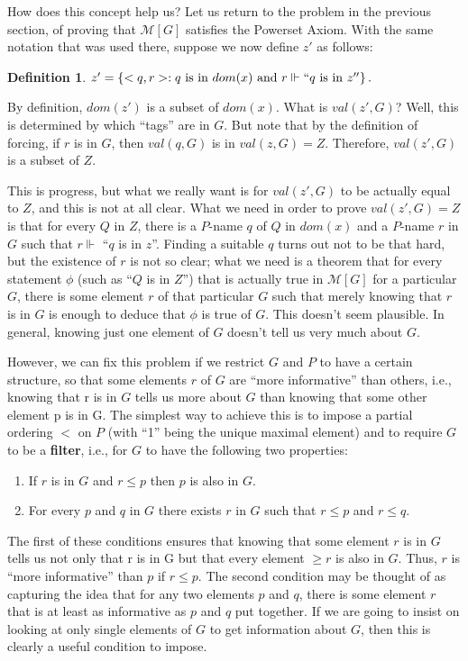 \documentclass[10pt]{article}
\theoremstyle{definition}
\newtheorem*{defn}{Definition}
\begin{document}
How does this concept help us? Let us return to the problem in the previous section, of proving that $\mathcal{M}[G]$ satisfies the Powerset Axiom. With the same notation that was used there, suppose we now define $z'$ as follows:

\begin{defn}
$z' = \left\{<q,r> : q\text{ is in }dom(x)\text{ and }r \Vdash ``q\text{ is in }z''\right\}.$
\end{defn}

By definition, $dom(z')$ is a subset of $dom(x)$. What is $val(z',G)$? Well, this is determined by which ``tags'' are in $G$. But note that by the definition of forcing, if $r$ is in $G$, then $val(q,G)$ is in $val(z,G) = Z$. Therefore, $val(z',G)$ is a subset of $Z$.

This is progress, but what we really want is for $val(z',G)$ to be actually equal to $Z$, and this is not at all clear. What we need in order to prove $val(z',G) = Z$ is that for every $Q$ in $Z$, there is a $P$-name $q$ of $Q$ in $dom(x)$ and a $P$-name $r$ in $G$ such that $r \Vdash$ ``$q$ is in $z$''. Finding a suitable $q$ turns out not to be that hard, but the existence of $r$ is not so clear; what we need is a theorem that for every statement $\phi$ (such as ``$Q$ is in $Z$'') that is actually true in $\mathcal{M}[G]$ for a particular $G$, there is some element $r$ of that particular $G$ such that merely knowing that $r$ is in $G$ is enough to deduce that $\phi$ is true of $G$. This doesn't seem plausible. In general, knowing just one element of $G$ doesn't tell us very much about $G$.

However, we can fix this problem if we restrict $G$ and $P$ to have a certain structure, so that some elements $r$ of $G$ are ``more informative'' than others, i.e., knowing that r is in $G$ tells us more about $G$ than knowing that some other element p is in G. The simplest way to achieve this is to impose a partial ordering $<$ on $P$ (with ``1'' being the unique maximal element) and to require $G$ to be a \textbf{filter}, i.e., for $G$ to have the following two properties:

\begin{enumerate}
\item If $r$ is in $G$ and $r \leq p$ then $p$ is also in $G$.
\item For every $p$ and $q$ in $G$ there exists $r$ in $G$ such that $r \leq p$ and $r \leq q$.
\end{enumerate}

The first of these conditions ensures that knowing that some element $r$ is in $G$ tells us not only that r is in G but that every element $\geq r$ is also in $G$. Thus, $r$ is ``more informative'' than $p$ if $r \leq p$. The second condition may be thought of as capturing the idea that for any two elements $p$ and $q$, there is some element $r$ that is at least as informative as $p$ and $q$ put together. If we are going to insist on looking at only single elements of $G$ to get information about $G$, then this is clearly a useful condition to impose.
\end{document}
